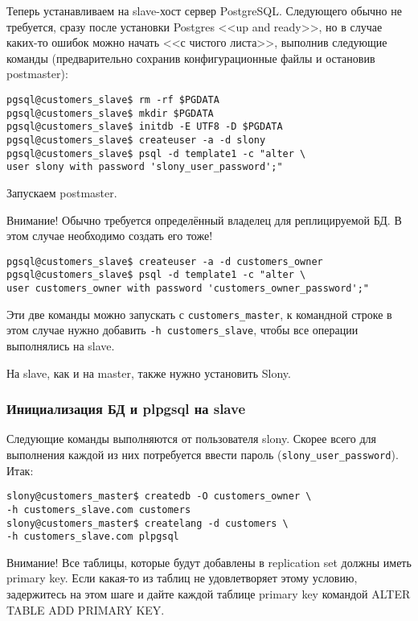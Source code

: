 Теперь устанавливаем на slave-хост сервер PostgreSQL. Следующего обычно не требуется, сразу после установки Postgres <<up and ready>>, но в случае каких-то ошибок можно начать <<с чистого листа>>, выполнив следующие команды (предварительно сохранив конфигурационные файлы и остановив postmaster):

\begin{lstlisting}[label=lst:slony4,caption=Подготовка одного slave-сервера]
pgsql@customers_slave$ rm -rf $PGDATA
pgsql@customers_slave$ mkdir $PGDATA
pgsql@customers_slave$ initdb -E UTF8 -D $PGDATA
pgsql@customers_slave$ createuser -a -d slony
pgsql@customers_slave$ psql -d template1 -c "alter \
user slony with password 'slony_user_password';"
\end{lstlisting}

Запускаем postmaster.

Внимание! Обычно требуется определённый владелец для реплицируемой БД. В этом случае необходимо создать его тоже!

\begin{lstlisting}[label=lst:slony5,caption=Подготовка одного slave-сервера]
pgsql@customers_slave$ createuser -a -d customers_owner
pgsql@customers_slave$ psql -d template1 -c "alter \
user customers_owner with password 'customers_owner_password';"
\end{lstlisting}

Эти две команды можно запускать с \lstinline!customers_master!, к командной строке в этом случае нужно добавить \lstinline!-h customers_slave!, чтобы все операции выполнялись на slave.

На slave, как и на master, также нужно установить Slony.

\subsubsection{Инициализация БД и plpgsql на slave}

Следующие команды выполняются от пользователя slony. Скорее всего для выполнения каждой из них потребуется ввести пароль (\lstinline!slony_user_password!). Итак:

\begin{lstlisting}[label=lst:slony6,caption=Инициализация БД и plpgsql на slave]
slony@customers_master$ createdb -O customers_owner \
-h customers_slave.com customers
slony@customers_master$ createlang -d customers \
-h customers_slave.com plpgsql
\end{lstlisting}

Внимание! Все таблицы, которые будут добавлены в replication set должны иметь primary key. Если какая-то из таблиц не удовлетворяет этому условию, задержитесь на этом шаге и дайте каждой таблице primary key командой ALTER TABLE ADD PRIMARY KEY.

